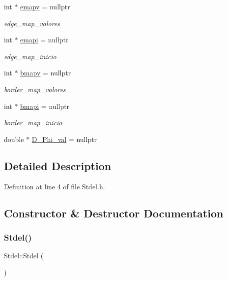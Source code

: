 \begin{DoxyCompactItemize}
int $\ast$ \hyperlink{classStdel_a39326d0ef108403223402c79b424a41b}{emapv} = nullptr
\begin{DoxyCompactList}\small\item\em edge\+\_\+map\+\_\+valores \end{DoxyCompactList}\item 
int $\ast$ \hyperlink{classStdel_a9ba8eb743aeb36984b7c4ececa837e16}{emapi} = nullptr
\begin{DoxyCompactList}\small\item\em edge\+\_\+map\+\_\+inicio \end{DoxyCompactList}\item 
int $\ast$ \hyperlink{classStdel_ac3cd818c98aa400279f28c22c8e0abaa}{bmapv} = nullptr
\begin{DoxyCompactList}\small\item\em border\+\_\+map\+\_\+valores \end{DoxyCompactList}\item 
int $\ast$ \hyperlink{classStdel_a8b082d27e5c3cab7ad2045b464af0fd9}{bmapi} = nullptr
\begin{DoxyCompactList}\small\item\em border\+\_\+map\+\_\+inicio \end{DoxyCompactList}\item 
double $\ast$ \hyperlink{classStdel_a80a6c89c61bfef1160257e97b3ffb0a2}{D\+\_\+\+Phi\+\_\+val} = nullptr
\end{DoxyCompactItemize}


\subsection{Detailed Description}


Definition at line 4 of file Stdel.\+h.



\subsection{Constructor \& Destructor Documentation}
\mbox{\label{classStdel_a6f8398df47bfe29fe96b89b604e0cd97}} 
\subsubsection{\texorpdfstring{Stdel()}{Stdel()}}
{\footnotesize\ttfamily Stdel\+::\+Stdel (\begin{DoxyParamCaption}{ }\end{DoxyParamCaption})\hspace{0.3cm}{\ttfamily [inline]}}



